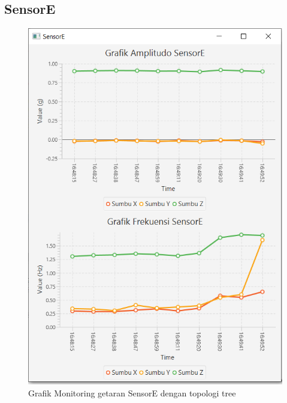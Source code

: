 \subsection{SensorE}
\begin{figure}[H] 
	\centering  
	\includegraphics[scale=1]{Lampiran/HasilPengujian/sensorE_tree.PNG} 
	\caption[Grafik Monitoring getaran Sensor E dengan topologi tree]{Grafik Monitoring getaran SensorE dengan topologi tree}
	\label{fig:grafik_E_tree_paskal} 
\end{figure}